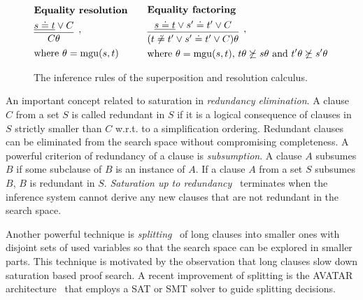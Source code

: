 \begin{figure}[ht]
\begin{equation*}
\begin{aligned}
\begin{aligned}
\begin{aligned}
          &\text{\textbf{Equality resolution}}\\
          &\infer[,]{C\theta}{\underline{s\eql t} \vee C}\\
          &\text{where $\theta=\mathrm{mgu}(s,t)$}
        \end{aligned}
        &\quad\quad
        \begin{aligned}
          &\text{\textbf{Equality factoring}}\\
          &\infer[,]{(t \not\eql t' \vee s' \eql t' \vee C)\theta}{\underline{s \eql t} \vee s' \eql t' \vee C}\\
          &\text{where $\theta=\mathrm{mgu}(s,t)$, $t\theta\not\succeq s\theta$ and $t'\theta\not\succeq s'\theta$}
        \end{aligned}
      \end{aligned}
    \end{aligned}
  \end{equation*}
  \caption{The inference rules of the superposition and resolution calculus.\label{fig:intro/calculus}}
\end{figure}

An important concept related to saturation in \emph{redundancy elimination}. A clause $C$ from a set $S$ is called redundant in $S$ if it is a logical consequence of clauses in $S$ strictly smaller than $C$ w.r.t. to a simplification ordering. Redundant clauses can be eliminated from the search space without compromising completeness. A powerful criterion of redundancy of a clause is \emph{subsumption}. A clause $A$ subsumes $B$ if some subclause of $B$ is an instance of $A$. If a clause $A$ from a set $S$ subsumes $B$, $B$ is redundant in $S$. \emph{Saturation up to redundancy}~\cite{NieuwenhuisRubio:HandbookAR:paramodulation:2001} terminates when the inference system cannot derive any new clauses that are not redundant in the search space. %

Another powerful technique is \emph{splitting}~\cite{DBLP:conf/cade/HoderV13} of long clauses into smaller ones with disjoint sets of used variables so that the search space can be explored in smaller parts. This technique is motivated by the observation that long clauses slow down saturation based proof search. A recent improvement of splitting is the AVATAR architecture~\cite{DBLP:conf/cav/Voronkov14} that employs a SAT or SMT solver to guide splitting decisions.

